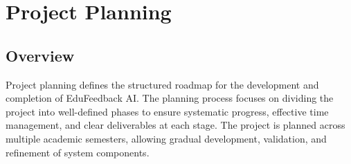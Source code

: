 \chapter{Project Planning}
\label{Chapter:Planning}

\section{Overview}
Project planning defines the structured roadmap for the development and
completion of EduFeedback AI. The planning process focuses on dividing the
project into well-defined phases to ensure systematic progress, effective time
management, and clear deliverables at each stage. The project is planned across
multiple academic semesters, allowing gradual development, validation, and
refinement of system components.


